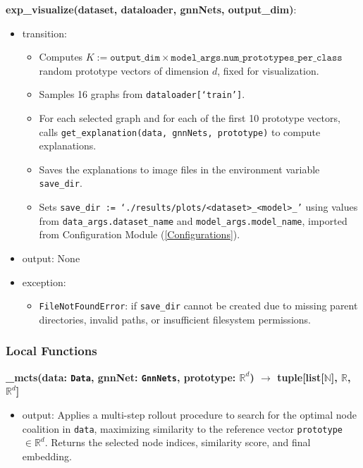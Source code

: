 \documentclass[12pt, titlepage]{article}
\begin{document}
\noindent \textbf{exp\_visualize(dataset, dataloader, gnnNets, output\_dim)}:
\begin{itemize}
  \item transition:
  \begin{itemize}
    \item Computes $K := \texttt{output\_dim} \times \texttt{model\_args.num\_prototypes\_per\_class}$ random prototype vectors of dimension $d$, fixed for visualization.
    \item Samples 16 graphs from \texttt{dataloader[`train']}.
    \item For each selected graph and for each of the first 10 prototype vectors, calls \texttt{get\_explanation(data, gnnNets, prototype)} to compute explanations.
    \item Saves the explanations to image files in the environment variable \texttt{save\_dir}.
    \item Sets \texttt{save\_dir := `./results/plots/<dataset>\_<model>\_'} using values from \texttt{data\_args.dataset\_name} and \texttt{model\_args.model\_name}, imported from Configuration Module (\ref{Configurations}).
  \end{itemize}
  \item output: None
  \item exception:
  \begin{itemize}
    \item \texttt{FileNotFoundError}: if \texttt{save\_dir} cannot be created due to missing parent directories, invalid paths, or insufficient filesystem permissions.
  \end{itemize}
\end{itemize}


\subsubsection{Local Functions}

\noindent \textbf{\_mcts(data: \texttt{Data}, gnnNet: \texttt{GnnNets}, prototype: \(\mathbb{R}^d\)) \(\rightarrow\) tuple[list[\(\mathbb{N}\)], \(\mathbb{R}\), \(\mathbb{R}^d\)]}
\begin{itemize}
  \item output: Applies a multi-step rollout procedure to search for the optimal node coalition in \texttt{data}, maximizing similarity to the reference vector \texttt{prototype} \(\in \mathbb{R}^d\). Returns the selected node indices, similarity score, and final embedding.
\end{itemize}
\end{document}
